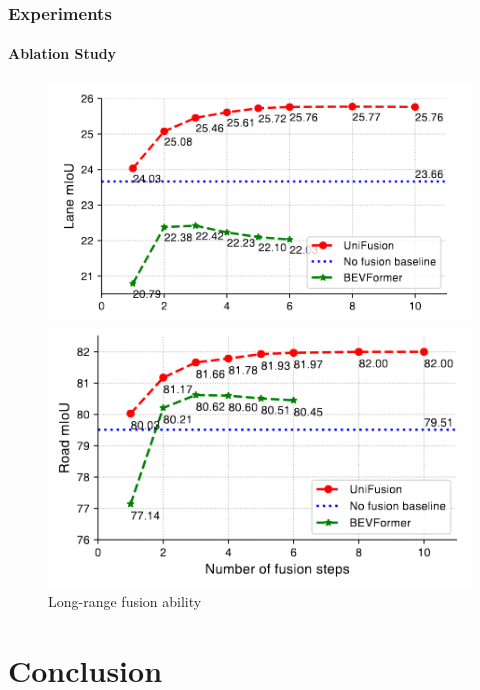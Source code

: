 \documentclass[
	12pt, %
	aspectratio=169, %
]{beamer}
\begin{document}
\begin{frame}
	\frametitle{Experiments}
	\framesubtitle{Ablation Study}

	\begin{figure}
		\centering
		\begin{minipage}{0.45\textwidth}
			\centering
			\includegraphics[width=\linewidth]{"./Images/result_long_lane.png"}
		\end{minipage}
		\begin{minipage}{0.45\textwidth}
			\centering
			\includegraphics[width=\linewidth]{"./Images/result_long_road.png"}
		\end{minipage}
		\caption{Long-range fusion ability}
	\end{figure}
\end{frame}


\section{Conclusion}
\end{document}
